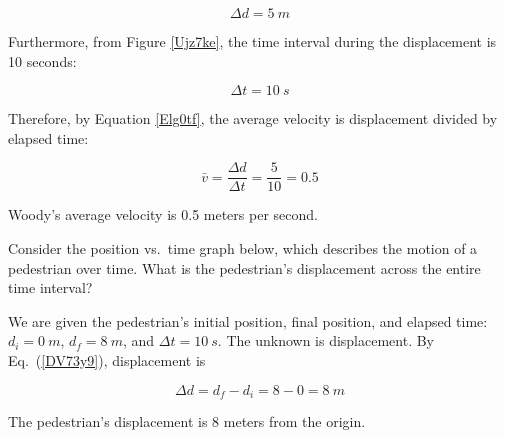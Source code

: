 \documentclass[main.tex]{subfiles}
\begin{document}
\begin{equation*}
    \Delta d = \SI{5}{m}
\end{equation*}

Furthermore, from Figure \ref{Ujz7ke}, the time interval during the displacement is 10 seconds:

\begin{equation*}
    \Delta t = \SI{10}{s}
\end{equation*}

Therefore, by Equation \eqref{Elg0tf}, the average velocity is displacement divided by elapsed time:

\begin{equation*}
    \bar{v} = \frac{\Delta d}{\Delta t} = \frac{5}{10} = 0.5
\end{equation*}

Woody's average velocity is 0.5 meters per second.

\solutionEnd

\begin{example} \label{Xpi5rU}
Consider the position vs.~time graph below, which describes the motion of a pedestrian over time. What is the pedestrian's displacement across the entire time interval?
\end{example}

\begin{center}
\end{center}

\Solution We are given the pedestrian's initial position, final position, and elapsed time: $d_i = \SI{0}{m}$, $d_f = \SI{8}{m}$, and $\Delta{t} = \SI{10}{s}$. The unknown is displacement. By Eq.~(\ref{DV73y9}), displacement is

\begin{equation*}
    \Delta d = d_f - d_i = 8 - 0 = \SI{+8}{m}
\end{equation*}

The pedestrian's displacement is 8 meters from the origin.

\solutionEnd
\end{document}

